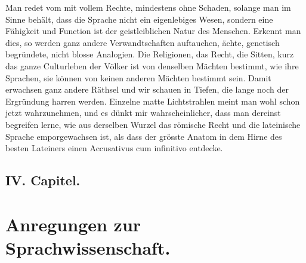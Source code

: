Man redet vom  mit vollem Rechte, mindestens ohne Schaden, solange man im Sinne behält, dass die Sprache nicht ein eigenlebiges Wesen, sondern eine Fähigkeit und Function ist der geistleiblichen Natur des Menschen. Erkennt man dies, so werden ganz andere Verwandtschaften auftauchen, ächte, genetisch begründete, nicht blosse Analogien. Die Religionen, das Recht, die Sitten, kurz das ganze Culturleben der Völker ist von denselben Mächten bestimmt, wie ihre Sprachen, sie können von keinen anderen Mächten bestimmt sein. Damit erwachsen ganz andere Räthsel und wir schauen in Tiefen, die lange noch der Ergründung harren werden. Einzelne matte Lichtstrahlen meint man wohl schon jetzt wahrzunehmen, und es dünkt mir wahrscheinlicher, dass man dereinst begreifen lerne, wie aus derselben Wurzel das römische Recht und die lateinische Sprache emporgewachsen ist, als dass der grösste Anatom in dem Hirne des besten Lateiners einen Accusativus cum infinitivo entdecke.

\label{fp.16}

\subsection*{IV. Capitel.}\label{I.IV}
\section*{Anregungen zur Sprachwissenschaft.}

